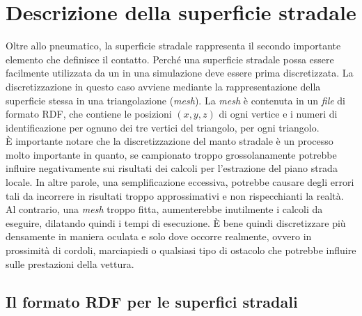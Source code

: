 \chapter{Descrizione della superficie stradale}
\label{rdf}
%
Oltre allo pneumatico, la superficie stradale rappresenta il secondo importante elemento che definisce il contatto. Perché una superficie stradale possa essere facilmente utilizzata da un in una simulazione deve essere prima discretizzata. La discretizzazione in questo caso avviene mediante la rappresentazione della superficie stessa in una triangolazione (\textit{mesh}). La \textit{mesh} è contenuta in un \textit{file} di formato \ac{RDF}, che contiene le posizioni $(x,y,z)$ di ogni vertice e i numeri di identificazione per ognuno dei tre vertici del triangolo, per ogni triangolo.\\
\indent
È importante notare che la discretizzazione del manto stradale è un processo molto importante in quanto, se campionato troppo grossolanamente potrebbe influire negativamente sui risultati dei calcoli per l'estrazione del piano strada locale. In altre parole, una semplificazione eccessiva, potrebbe causare degli errori tali da incorrere in risultati troppo approssimativi e non rispecchianti la realtà. Al contrario, una \textit{mesh} troppo fitta, aumenterebbe inutilmente i calcoli da eseguire, dilatando quindi i tempi di esecuzione. È bene quindi discretizzare più densamente in maniera oculata e solo dove occorre realmente, ovvero in prossimità di cordoli, marciapiedi o qualsiasi tipo di ostacolo che potrebbe influire sulle prestazioni della vettura.

\section{Il formato RDF per le superfici stradali}
%
